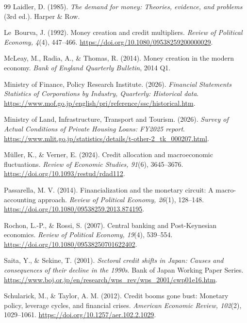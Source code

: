 \documentclass[11pt]{article}
\begin{document}
\begin{thebibliography}{99}
Laidler, D. (1985).
\emph{The demand for money: Theories, evidence, and problems} (3rd ed.).
Harper \& Row.

Le~Bourva, J. (1992).
Money creation and credit multipliers.
\emph{Review of Political Economy, 4}(4), 447--466.
\url{https://doi.org/10.1080/09538259200000029}.

McLeay, M., Radia, A., \& Thomas, R. (2014).
Money creation in the modern economy.
\emph{Bank of England Quarterly Bulletin}, 2014 Q1.

Ministry of Finance, Policy Research Institute. (2026).
\emph{Financial Statements Statistics of Corporations by Industry,
Quarterly: Historical data}.
\url{https://www.mof.go.jp/english/pri/reference/ssc/historical.htm}.

Ministry of Land, Infrastructure, Transport and Tourism. (2026).
\emph{Survey of Actual Conditions of Private Housing Loans: FY2025 report}.
\url{https://www.mlit.go.jp/statistics/details/t-other-2_tk_000207.html}.

M{\"u}ller, K., \& Verner, E. (2024).
Credit allocation and macroeconomic fluctuations.
\emph{Review of Economic Studies, 91}(6), 3645--3676.
\url{https://doi.org/10.1093/restud/rdad112}.

Passarella, M. V. (2014).
Financialization and the monetary circuit: A macro-accounting approach.
\emph{Review of Political Economy, 26}(1), 128--148.
\url{https://doi.org/10.1080/09538259.2013.874195}.

Rochon, L.-P., \& Rossi, S. (2007).
Central banking and Post-Keynesian economics.
\emph{Review of Political Economy, 19}(4), 539--554.
\url{https://doi.org/10.1080/09538250701622402}.

Saita, Y., \& Sekine, T. (2001).
\emph{Sectoral credit shifts in Japan: Causes and consequences of their
decline in the 1990s}. Bank of Japan Working Paper Series.
\url{https://www.boj.or.jp/en/research/wps_rev/wps_2001/cwp01e16.htm}.

Schularick, M., \& Taylor, A. M. (2012).
Credit booms gone bust: Monetary policy, leverage cycles, and financial
crises.
\emph{American Economic Review, 102}(2), 1029--1061.
\url{https://doi.org/10.1257/aer.102.2.1029}.


\end{thebibliography}
\end{document}
